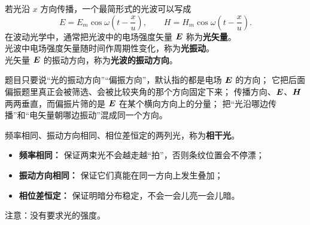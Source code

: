 \documentclass[lang=cn,11pt]{elegantbook}
\begin{document}
\begin{definition}
若光沿 \(x\) 方向传播，一个最简形式的光波可以写成
\[
E=E_m\cos\omega\left(t-\frac{x}{u}\right),\qquad
H=H_m\cos\omega\left(t-\frac{x}{u}\right).
\]
在波动光学中，通常把光波中的电场强度矢量 \(\vb*{E}\) 称为\textbf{光矢量}。\\
光波中电场强度矢量随时间作周期性变化，称为\textbf{光振动}。\\
光矢量 \(\vb*{E}\) 的振动方向，称为\textbf{光波的振动方向}。
\end{definition}

\begin{note}
 题目只要说“光的振动方向”“偏振方向”，默认指的都是电场 \(\vb*{E}\) 的方向； 它把后面偏振题里真正会被筛选、会被比较夹角的那个方向固定下来； 传播方向、\(\vb*{E}\)、\(\vb*{H}\) 两两垂直，而偏振片筛的是 \(\vb*{E}\) 在某个横向方向上的分量； 把“光沿哪边传播”和“电矢量朝哪边振动”混成同一个方向。
\end{note}

\begin{definition}[相干光]\label{def:coherent-light}
频率相同、振动方向相同、相位差恒定的两列光，称为\textbf{相干光}。
\begin{itemize}
 \item \textbf{频率相同：} 保证两束光不会越走越“拍”，否则条纹位置会不停漂；
 \item \textbf{振动方向相同：} 保证它们真能在同一方向上发生叠加；
 \item \textbf{相位差恒定：} 保证明暗分布稳定，不会一会儿亮一会儿暗。
\end{itemize}
注意：没有要求光的强度。
\end{definition}
\end{document}
